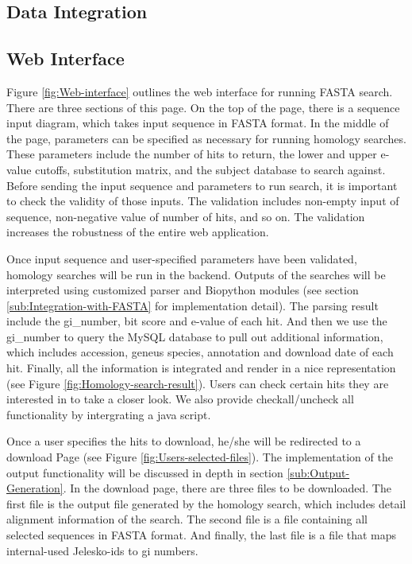 \documentclass[11pt,letterpaper,twoside,english]{article}
\begin{document}
\subsection{Data Integration}




\subsection{Web Interface}







Figure \ref{fig:Web-interface} outlines the web interface for running
FASTA search. There are three sections of this page. On the top of
the page, there is a sequence input diagram, which takes input sequence
in FASTA format. In the middle of the page, parameters can be specified
as necessary for running homology searches. These parameters include
the number of hits to return, the lower and upper e-value cutoffs,
substitution matrix, and the subject database to search against. Before
sending the input sequence and parameters to run search, it is important
to check the validity of those inputs. The validation includes non-empty
input of sequence, non-negative value of number of hits, and so on.
The validation increases the robustness of the entire web application.

Once input sequence and user-specified parameters have been validated,
homology searches will be run in the backend. Outputs of the searches
will be interpreted using customized parser and Biopython modules
(see section \ref{sub:Integration-with-FASTA} for implementation
detail). The parsing result include the gi\_number, bit score and
e-value of each hit. And then we use the gi\_number to query the MySQL
database to pull out additional information, which includes accession,
geneus species, annotation and download date of each hit. Finally,
all the information is integrated and render in a nice representation
(see Figure \ref{fig:Homology-search-result}). Users can check certain
hits they are interested in to take a closer look. We also provide
checkall/uncheck all functionality by intergrating a java script.

Once a user specifies the hits to download, he/she will be redirected
to a download Page (see Figure \ref{fig:Users-selected-files}). The
implementation of the output functionality will be discussed in depth
in section \ref{sub:Output-Generation}. In the download page, there
are three files to be downloaded. The first file is the output file
generated by the homology search, which includes detail alignment
information of the search. The second file is a file containing all
selected sequences in FASTA format. And finally, the last file is
a file that maps internal-used Jelesko-ids to gi numbers.
\end{document}
